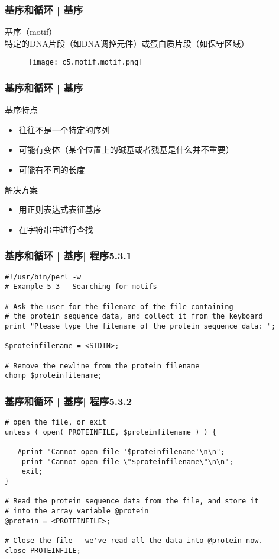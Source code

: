 \begin{frame}
  \frametitle{基序和循环 | 基序}
  \begin{block}{基序（motif）}
    特定的DNA片段（如DNA调控元件）或蛋白质片段（如保守区域）
  \end{block}
  \begin{figure}
    \centering
    \texttt{[image: c5.motif.motif.png]}
  \end{figure}
\end{frame}

\begin{frame}
  \frametitle{基序和循环 | 基序}
  \begin{block}{基序特点}
    \begin{itemize}
      \item 往往不是一个特定的序列
      \item 可能有变体（某个位置上的碱基或者残基是什么并不重要）
      \item 可能有不同的长度
    \end{itemize}
  \end{block}
  \pause
  \begin{block}{解决方案}
    \begin{itemize}
      \item 用正则表达式表征基序
      \item 在字符串中进行查找
    \end{itemize}
  \end{block}
\end{frame}

\begin{frame}[fragile]
  \frametitle{基序和循环 | 基序| 程序5.3.1}
\begin{lstlisting}[firstnumber=1]
#!/usr/bin/perl -w
# Example 5-3   Searching for motifs

# Ask the user for the filename of the file containing
# the protein sequence data, and collect it from the keyboard
print "Please type the filename of the protein sequence data: ";

$proteinfilename = <STDIN>;

# Remove the newline from the protein filename
chomp $proteinfilename;
\end{lstlisting}
\end{frame}

\begin{frame}[fragile]
  \frametitle{基序和循环 | 基序| 程序5.3.2}
\begin{lstlisting}[firstnumber=13,basicstyle=\small\tt]
# open the file, or exit
unless ( open( PROTEINFILE, $proteinfilename ) ) {

   #print "Cannot open file '$proteinfilename'\n\n";
    print "Cannot open file \"$proteinfilename\"\n\n";
    exit;
}

# Read the protein sequence data from the file, and store it
# into the array variable @protein
@protein = <PROTEINFILE>;

# Close the file - we've read all the data into @protein now.
close PROTEINFILE;
\end{lstlisting}
\end{frame}

